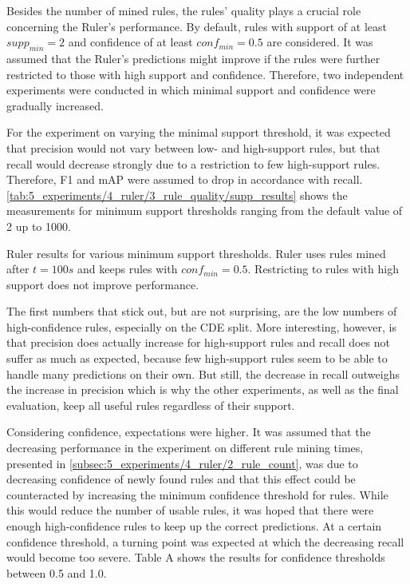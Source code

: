Besides the number of mined rules, the rules' quality plays a crucial role concerning the Ruler's performance. By default, rules with support of at least $supp_{min} = 2$ and confidence of at least $conf_{min} = 0.5$ are considered. It was assumed that the Ruler's predictions might improve if the rules were further restricted to those with high support and confidence. Therefore, two independent experiments were conducted in which minimal support and confidence were gradually increased.

For the experiment on varying the minimal support threshold, it was expected that precision would not vary between low- and high-support rules, but that recall would decrease strongly due to a restriction to few high-support rules. Therefore, F1 and mAP were assumed to drop in accordance with recall. \autoref{tab:5_experiments/4_ruler/3_rule_quality/supp_results} shows the measurements for minimum support thresholds ranging from the default value of 2 up to 1000.

\begin{table}
    \centering
    
    \caption{Ruler results for various minimum support thresholds. Ruler uses rules mined after $t = 100s$ and keeps rules with $conf_{min} = 0.5$. Restricting to rules with high support does not improve performance.}
    \label{tab:5_experiments/4_ruler/3_rule_quality/supp_results}
\end{table}

The first numbers that stick out, but are not surprising, are the low numbers of high-confidence rules, especially on the CDE split. More interesting, however, is that precision does actually increase for high-support rules and recall does not suffer as much as expected, because few high-support rules seem to be able to handle many predictions on their own. But still, the decrease in recall outweighs the increase in precision which is why the other experiments, as well as the final evaluation, keep all useful rules regardless of their support.

Considering confidence, expectations were higher. It was assumed that the decreasing performance in the experiment on different rule mining times, presented in \autoref{subsec:5_experiments/4_ruler/2_rule_count}, was due to decreasing confidence of newly found rules and that this effect could be counteracted by increasing the minimum confidence threshold for rules. While this would reduce the number of usable rules, it was hoped that there were enough high-confidence rules to keep up the correct predictions. At a certain confidence threshold, a turning point was expected at which the decreasing recall would become too severe. Table A shows the results for confidence thresholds between 0.5 and 1.0.

